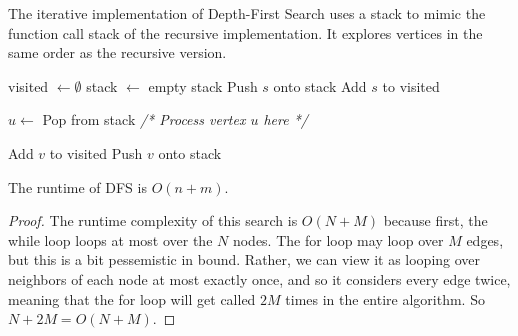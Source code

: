   \begin{algo}
    The iterative implementation of Depth-First Search uses a stack to mimic the function call stack of the recursive implementation. It explores vertices in the same order as the recursive version.
    \begin{algorithm}[H]
      \label{alg:dfs_iterative}
      \begin{algorithmic}[1]
        
          \State visited $\gets \emptyset$ 
          \State stack $\gets$ empty stack
          \State Push $s$ onto stack
          \State Add $s$ to visited
          
            \State $u \gets$ Pop from stack
            \State \textit{/* Process vertex $u$ here */}
            
                \State Add $v$ to visited
                \State Push $v$ onto stack
              \EndIf
            \EndFor
          \EndWhile
        \EndFunction
      \end{algorithmic}
    \end{algorithm}
  \end{algo}

  \begin{theorem}
    The runtime of DFS is $O(n+m)$. 
  \end{theorem}
  \begin{proof}
    The runtime complexity of this search is $O(N + M)$ because first, the while loop loops at most over the $N$ nodes. The for loop may loop over $M$ edges, but this is a bit pessemistic in bound. Rather, we can view it as looping over neighbors of each node at most exactly once, and so it considers every edge twice, meaning that the for loop will get called $2M$ times in the entire algorithm. So $N + 2M = O(N + M)$. 
  \end{proof}

